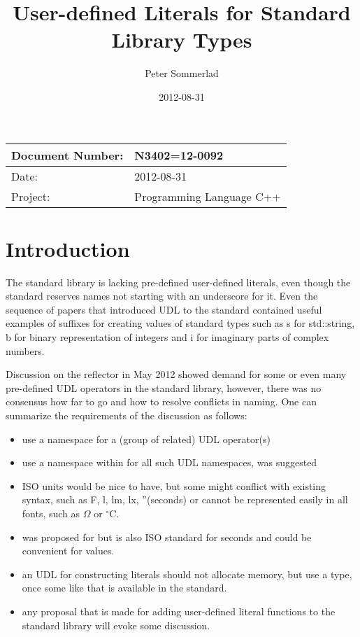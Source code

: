 \documentclass[ebook,11pt,article]{memoir}
\title{User-defined Literals for Standard Library Types}
\author{Peter Sommerlad}
\date{2012-08-31}                                           %
\begin{document}
\maketitle
\begin{tabular}[t]{|l|l|}\hline 
Document Number: &  N3402=12-0092 \\\hline
Date: & 2012-08-31 \\\hline
Project: & Programming Language C++\\\hline 
\end{tabular}

\chapter{Introduction}
The standard library is lacking pre-defined user-defined literals, even though the standard reserves names not starting with an underscore for it. Even the sequence of papers that introduced UDL to the standard contained useful examples of suffixes for creating values of standard types such as s for std::string, b for binary representation of integers and i for imaginary parts of complex numbers.

Discussion on the reflector in May 2012 showed demand for some or even many pre-defined UDL operators in the standard library, however, there was no consensus how far to go and how to resolve conflicts in naming. One can summarize the requirements of the discussion as follows:
\begin{itemize}
\item use a namespace for a (group of related) UDL operator(s)
\item use a namespace within  for all such UDL namespaces,  was suggested
\item ISO units would be nice to have, but some might conflict with existing syntax, such as F, l, lm, lx, ''(seconds) or cannot be represented easily in all fonts, such as $\Omega$ or $^{\circ}\mathrm{C}$.
\item {} was proposed for  but is also ISO standard for seconds and could be convenient for  values.
\item an UDL for constructing  literals should not allocate memory, but use a  type, once some like that is available in the standard.
\item any proposal that is made for adding user-defined literal functions to the standard library will evoke some discussion.
\end{itemize}
\end{document}
